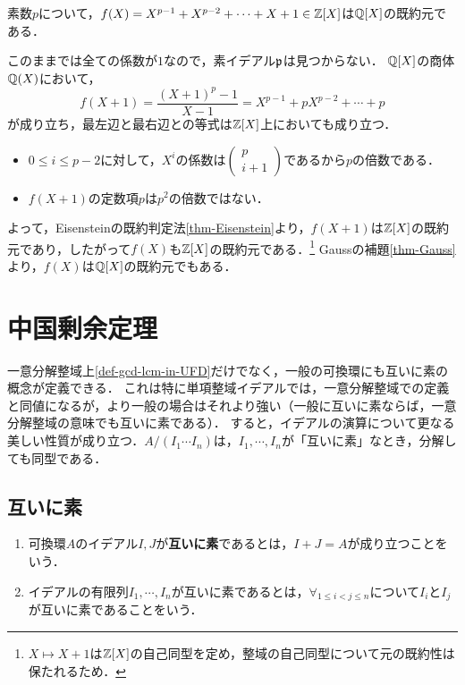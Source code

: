 \documentclass[uplatex,dvipdfmx]{jsreport}
\begin{document}
\begin{example}[既約多項式]\label{exp-Eisenstein}
    素数$p$について，$f(X)=X^{p-1}+X^{p-2}+\cdots+X+1\in\mathbb{Z}[X]$は$\mathbb{Q}[X]$の既約元である．

    このままでは全ての係数が$1$なので，素イデアル$\mathfrak{p}$は見つからない．
    $\mathbb{Q}[X]$の商体$\mathbb{Q}(X)$において，
    \[f(X+1)=\frac{(X+1)^p-1}{X-1}=X^{p-1}+pX^{p-2}+\cdots+p\]
    が成り立ち，最左辺と最右辺との等式は$\mathbb{Z}[X]$上においても成り立つ．
    \begin{itemize}
        \item $0\le i\le p-2$に対して，$X^i$の係数は$\begin{pmatrix}p\\i+1\end{pmatrix}$であるから$p$の倍数である．
        \item $f(X+1)$の定数項$p$は$p^2$の倍数ではない．
    \end{itemize}
    よって，Eisensteinの既約判定法\ref{thm-Eisenstein}より，$f(X+1)$は$\mathbb{Z}[X]$の既約元であり，したがって$f(X)$も$\mathbb{Z}[X]$の既約元である．\footnote{$X\mapsto X+1$は$\mathbb{Z}[X]$の自己同型を定め，整域の自己同型について元の既約性は保たれるため．}
    Gaussの補題\ref{thm-Gauss}より，$f(X)$は$\mathbb{Q}[X]$の既約元でもある．
\end{example}

\section{中国剰余定理}

\begin{tcolorbox}[colframe=ForestGreen, colback=ForestGreen!10!white,breakable,colbacktitle=ForestGreen!40!white,coltitle=black,fonttitle=\bfseries\sffamily,
title=可換環の剰余環の形は，剰余を互いに素なイデアルについて分解すれば決定できる]
    一意分解整域上\ref{def-gcd-lcm-in-UFD}だけでなく，一般の可換環にも互いに素の概念が定義できる．
    これは特に単項整域イデアルでは，一意分解整域での定義と同値になるが，より一般の場合はそれより強い（一般に互いに素ならば，一意分解整域の意味でも互いに素である）．
    すると，イデアルの演算について更なる美しい性質が成り立つ．$A/(I_1\cdots I_n)$は，$I_1,\cdots,I_n$が「互いに素」なとき，分解しても同型である．
\end{tcolorbox}

\subsection{互いに素}

\begin{definition}[coprime]\mbox{}
    \begin{enumerate}
        \item 可換環$A$のイデアル$I,J$が\textbf{互いに素}であるとは，$I+J=A$が成り立つことをいう．
        \item イデアルの有限列$I_1,\cdots,I_n$が互いに素であるとは，$\forall_{1\le i<j\le n}$について$I_i$と$I_j$が互いに素であることをいう．
    \end{enumerate}
\end{definition}
\end{document}
